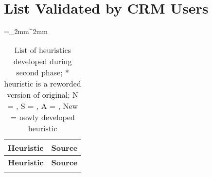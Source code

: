 \section{List Validated by CRM Users}
\label{appsec:users_list}
\begin{singlespace}
		\tabulinesep=_2mm^2mm
	\begin{longtabu} to \textwidth {X[1, p] c}
			\caption[List of heuristics developed during second phase]{List of heuristics developed during second phase; * heuristic is a reworded version of original; N = \citet{Nielsen1994a}, S = \citet{Singh2009}, A = \citet{Ardito2006}, New = newly developed heuristic}\\
			\toprule
			\textbf{Heuristic} & \textbf{Source} \\
			\midrule
		\endfirsthead
			
			\textbf{Heuristic} & \textbf{Source} \\
			\midrule
		\endhead
		
			\bottomrule
		\endlastfoot
		

\end{longtabu}
\end{singlespace}
